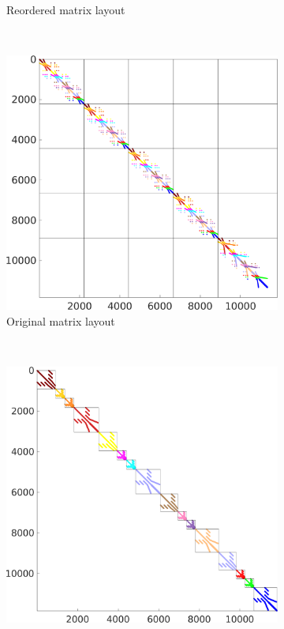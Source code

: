 \begin{figure}
\begin{subfigure}[t]{0.49\textwidth}
    \caption{Reordered matrix layout}%
    \label{fig:16_reordered_matrix}%
  \end{subfigure}
  \\
  \begin{subfigure}[t]{0.49\textwidth}%
    \centering%
    \includegraphics[width=\textwidth]{images/implementation/16_original_diagonal_matrix.png}
    \caption{Original matrix layout}%
    \label{fig:16_original_diagonal_matrix}%
  \end{subfigure}
  \,
  \begin{subfigure}[t]{0.49\textwidth}%
    \centering%
    \includegraphics[width=\textwidth]{images/implementation/16_reordered_diagonal_matrix.png}

\end{subfigure}
\end{figure}
